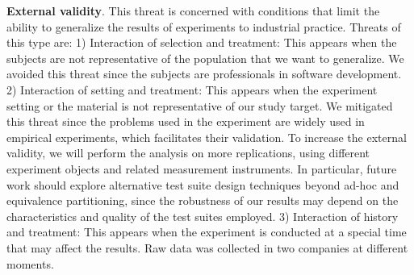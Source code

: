 \textbf{External validity}. This threat is concerned with conditions that limit the ability to generalize the results of experiments to industrial practice. Threats of this type are: 1) Interaction of selection and treatment: This appears when the subjects are not representative of the population that we want to generalize. We avoided this threat since the subjects are professionals in software development. 2) Interaction of setting and treatment: This appears when the experiment setting or the material is not representative of our study target. We mitigated this threat since the problems used in the experiment are widely used in empirical experiments, which facilitates their validation. To increase the external validity, we will perform the analysis on more replications, using different experiment objects and related measurement instruments. In particular, future work should explore alternative test suite design techniques beyond ad-hoc and equivalence partitioning, since the robustness of our results may depend on the characteristics and quality of the test suites employed. 3) Interaction of history and treatment: This appears when the experiment is conducted at a special time that may affect the results. Raw data was collected in two companies at different moments.


